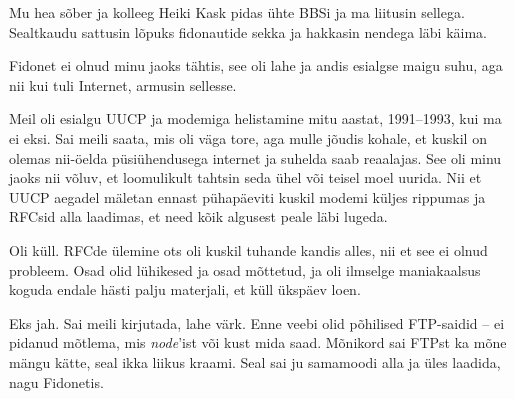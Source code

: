 
Mu hea sõber ja kolleeg Heiki Kask pidas ühte 
BBSi ja ma liitusin sellega. Sealtkaudu sattusin lõpuks fidonautide 
sekka ja hakkasin nendega läbi käima. 


Fidonet ei olnud minu jaoks tähtis, see oli lahe ja andis 
esialgse maigu suhu, aga nii kui tuli Internet, armusin sellesse.


Meil oli esialgu UUCP ja modemiga helistamine mitu aastat, 1991–1993, kui ma 
ei eksi. Sai meili saata, mis oli väga tore, aga mulle jõudis kohale, et kuskil on 
olemas nii-öelda püsiühendusega internet ja suhelda saab reaalajas. 
See oli minu jaoks nii võluv, et 
loomulikult tahtsin seda ühel või teisel moel uurida. Nii et UUCP 
aegadel mäletan ennast pühapäeviti kuskil modemi küljes rippumas ja RFCsid 
alla laadimas, et need kõik algusest peale läbi lugeda.


Oli küll. RFCde ülemine ots oli kuskil tuhande kandis alles, nii et see ei olnud 
probleem. Osad olid lühikesed ja osad mõttetud, ja oli ilmselge maniakaalsus 
koguda endale hästi palju materjali, et küll ükspäev loen.


Eks jah. Sai meili kirjutada, lahe värk. Enne veebi olid 
põhilised FTP-saidid – ei pidanud mõtlema, mis \emph{node}'ist või kust 
mida saad. Mõnikord sai FTPst ka mõne mängu kätte, seal ikka liikus kraami. 
Seal sai ju samamoodi alla ja üles laadida, nagu Fidonetis. 

